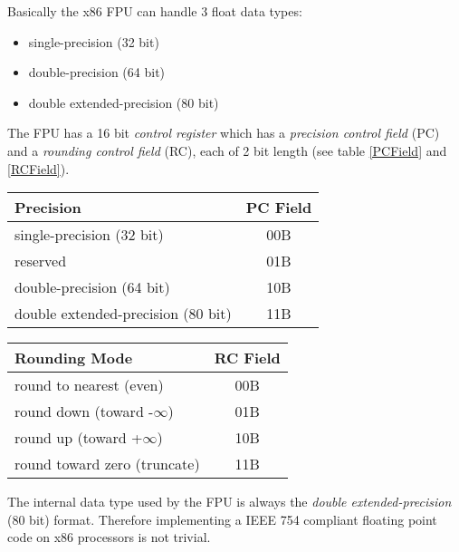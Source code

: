 Basically the x86 FPU can handle 3 float data types:

\begin{itemize}
 \item single-precision (32 bit)
 \item double-precision (64 bit)
 \item double extended-precision (80 bit)
\end{itemize}

The FPU has a 16 bit \textit{control register} which has a
\textit{precision control field} (PC) and a \textit{rounding control
field} (RC), each of 2 bit length (see table \ref{PCField} and
\ref{RCField}).

\begin{table*}
\begin{center}
\begin{tabular}[b]{|l|c|}
\hline 
Precision                          & PC Field \\ \hline
single-precision (32 bit)          & 00B      \\ \hline
reserved                           & 01B      \\ \hline
double-precision (64 bit)          & 10B      \\ \hline
double extended-precision (80 bit) & 11B      \\ \hline
\end{tabular}
\caption{Precision Control Field (PC)}
\label{PCField}
\end{center}
\end{table*}

\begin{table*}
\begin{center}
\begin{tabular}[b]{|l|c|}
\hline 
Rounding Mode                 & RC Field \\ \hline
round to nearest (even)       & 00B      \\ \hline
round down (toward -$\infty$) & 01B      \\ \hline
round up (toward +$\infty$)   & 10B      \\ \hline
round toward zero (truncate)  & 11B      \\ \hline
\end{tabular}
\caption{Rounding Control Field (RC)}
\label{RCField}
\end{center}
\end{table*}

The internal data type used by the FPU is always the \textit{double
extended-precision} (80 bit) format. Therefore implementing a IEEE 754
compliant floating point code on x86 processors is not trivial.

